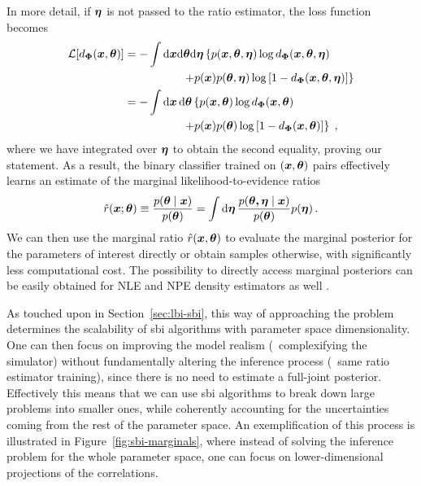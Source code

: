 In more detail, if $\bm{\eta}$ is not passed to the ratio estimator, the loss function becomes
\begin{align} 
   \mathcal{L}[d_{\bm{\Phi}}(\bm{x}, \bm{\theta})]&= -\int \dd\bm{x} \dd\bm{\theta} \dd\bm{\eta}\left\{ p(\bm{x},\bm{\theta}, \bm{\eta}) \log d_{\bm{\Phi}}(\bm{x}, \bm{\theta},\bm{\eta}) \right. \notag \\
    &\hspace{1.8cm} \left. + p(\bm{x}) p(\bm{\theta}, \bm{\eta}) \log\left[ 1 - d_{\bm{\Phi}}(\bm{x}, \bm{\theta},\bm{\eta}) \right] \right\} \\
    &= -\int \dd{\ensuremath{\bm{x}}} \dd{\ensuremath{\bm{\theta}}} \left\{ p(\bm{x}, \bm{\theta}) \log d_{\bm{\Phi}}(\bm{x}, \bm{\theta}) \right. \notag \\
    &\hspace{1.8cm} \left. + p(\bm{x}) p(\bm{\theta}) \log\left[ 1 - d_{\bm{\Phi}}(\bm{x}, \bm{\theta}) \right] \right\} \;, \label{eq:sbi-bce-m}
\end{align}
where we have integrated over $\bm{\eta}$ to obtain the second equality, proving our statement. 
As a result, the binary classifier trained on $(\bm{x}, \bm{\theta})$ pairs effectively learns an estimate of the marginal likelihood-to-evidence ratios 
\begin{equation}\label{eq:sbi-ratio_marginal}
    \hat{r}(\bm{x};\bm{\theta}) \equiv \frac{p(\bm{\theta} \mid \bm{x})}{p(\bm{\theta})} =  \int \mathrm{d}\bm{\eta} \, \frac{p(\boldsymbol{\theta, \eta} \mid \bm{x})}{p(\bm{\theta})} p(\bm{\eta})  \, .
\end{equation}
We can then use the marginal ratio $\hat{r}(\bm{x},\bm{\theta})$ to evaluate the marginal posterior for the parameters of interest directly or obtain samples otherwise, with significantly less computational cost. The possibility to directly access marginal posteriors can be easily obtained for  NLE and NPE density estimators as well \cite{Alsing:2019xrx, Jeffrey:2020itg}.

As touched upon in Section~\ref{sec:lbi-sbi}, this way of approaching the problem determines the scalability of \gls*{sbi} algorithms with parameter space dimensionality.
One can then focus on improving the model realism (\ie~complexifying the simulator) without fundamentally altering the inference process (\ie~same ratio estimator training), since there is no need to estimate a full-joint posterior. Effectively this means that we can use \gls*{sbi} algorithms to break down large problems into smaller ones, while coherently accounting for the uncertainties coming from the rest of the parameter space. An exemplification of this process is illustrated in Figure~\ref{fig:sbi-marginals}, where instead of solving the inference problem for the whole parameter space, one can focus on lower-dimensional projections of the correlations. 

